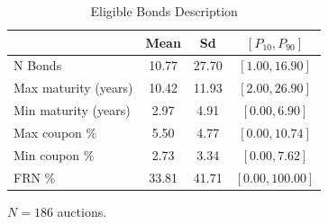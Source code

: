 \begin{table}[htbp]
\centering
\caption{Eligible Bonds Description}
\label{tab:os1}
\begin{tabular}{lccc}
\hline\hline
 & Mean & Sd & $[P_{10}, P_{90}]$ \\
\hline
N Bonds & 10.77 & 27.70 & $[1.00, 16.90]$ \\
Max maturity (years) & 10.42 & 11.93 & $[2.00, 26.90]$ \\
Min maturity (years) & 2.97 & 4.91 & $[0.00, 6.90]$ \\
Max coupon \% & 5.50 & 4.77 & $[0.00, 10.74]$ \\
Min coupon \% & 2.73 & 3.34 & $[0.00, 7.62]$ \\
FRN \% & 33.81 & 41.71 & $[0.00, 100.00]$ \\
\hline\hline
\end{tabular}
\begin{tablenotes}\small\item $N = 186$ auctions.\end{tablenotes}
\end{table}
